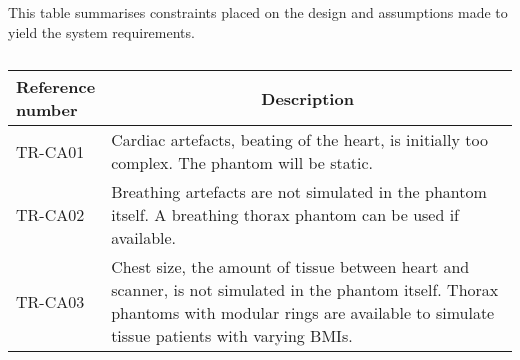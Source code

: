 \begin{table}[H]
\caption{}
\label{tab:constassump}
This table summarises constraints placed on the design and assumptions made to yield the system requirements.
\begin{tabular}{l|p{120mm}|}
	\makecell[l]{\textbf{Reference} \\ \textbf{number}} & \multicolumn{1}{c}{\textbf{Description}}\\
	\hline
	TR-CA01 &  Cardiac artefacts, beating of the heart, is initially too complex. The phantom will be static. \\
	TR-CA02 & Breathing artefacts are not simulated in the phantom itself. A breathing thorax phantom can be used if available. \\
	TR-CA03 & Chest size, the amount of tissue between heart and scanner, is not simulated in the phantom itself. Thorax phantoms with modular rings are available to simulate tissue patients with varying BMIs. \\
	\cline{2-2}
\end{tabular}
\end{table}
